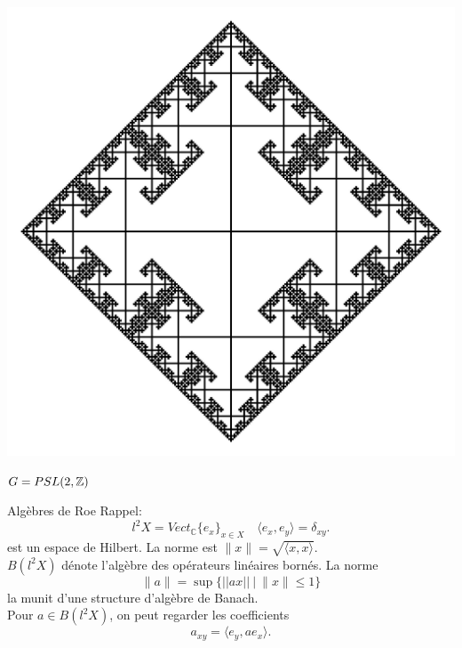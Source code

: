 \begin{frame}
\begin{center}
\vfill
\includegraphics[width=0.8\linewidth]{Cayley}
\vfill
\end{center}
\end{frame}

\begin{frame}{$G=PSL(2,\mathbb Z)$}
\begin{center}
\end{center}\end{frame}

\begin{frame}{Alg\`ebres de Roe}
Rappel: 
\[l^2X = Vect_{\mathbb C} \{e_x\}_{x\in X} \quad \langle e_x, e_y\rangle =\delta_{xy}. \]
est un espace de Hilbert. La norme est $\|x\| =\sqrt{\langle x, x\rangle}$.\\
\vfill
$B(l^2X)$ d\'enote l'alg\`ebre des op\'erateurs lin\'eaires born\'es. La norme
\[\|a\| = \sup \{ ||ax|| \ | \ \|x\| \leq 1 \} \] 
la munit d'une structure d'alg\`ebre de Banach.\\
\vfill
Pour $a\in B(l^2 X)$, on peut regarder les coefficients \[a_{xy} = \langle e_y, ae_x \rangle.\]
\end{frame}

